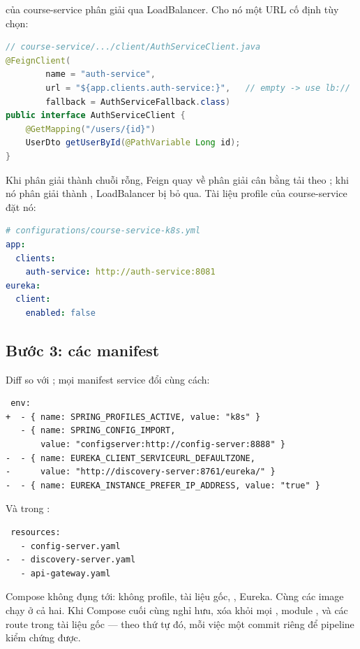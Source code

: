  của course-service phân giải
 qua LoadBalancer. Cho nó một URL cố định tùy chọn:

\begin{lstlisting}[language=Java]
// course-service/.../client/AuthServiceClient.java
@FeignClient(
        name = "auth-service",
        url = "${app.clients.auth-service:}",   // empty -> use lb://
        fallback = AuthServiceFallback.class)
public interface AuthServiceClient {
    @GetMapping("/users/{id}")
    UserDto getUserById(@PathVariable Long id);
}
\end{lstlisting}

Khi  phân giải thành chuỗi rỗng, Feign quay về phân giải cân
bằng tải theo ; khi nó phân giải thành
, LoadBalancer bị bỏ qua. Tài liệu
profile của course-service đặt nó:

\begin{lstlisting}[language=yaml]
# configurations/course-service-k8s.yml
app:
  clients:
    auth-service: http://auth-service:8081
eureka:
  client:
    enabled: false
\end{lstlisting}

\subsection{Bước 3: các manifest}

Diff so với ; mọi manifest
service đổi cùng cách:

\begin{lstlisting}
 env:
+  - { name: SPRING_PROFILES_ACTIVE, value: "k8s" }
   - { name: SPRING_CONFIG_IMPORT,
       value: "configserver:http://config-server:8888" }
-  - { name: EUREKA_CLIENT_SERVICEURL_DEFAULTZONE,
-      value: "http://discovery-server:8761/eureka/" }
-  - { name: EUREKA_INSTANCE_PREFER_IP_ADDRESS, value: "true" }
\end{lstlisting}

Và trong :

\begin{lstlisting}
 resources:
   - config-server.yaml
-  - discovery-server.yaml
   - api-gateway.yaml
\end{lstlisting}

Compose không đụng tới: không profile, tài liệu gốc, ,
Eureka. Cùng các image chạy ở cả hai. Khi Compose cuối cùng nghỉ hưu,
xóa  khỏi mọi
, module , và các route
 trong tài liệu gốc --- theo thứ tự đó, mỗi việc một commit
riêng để pipeline kiểm chứng được.

